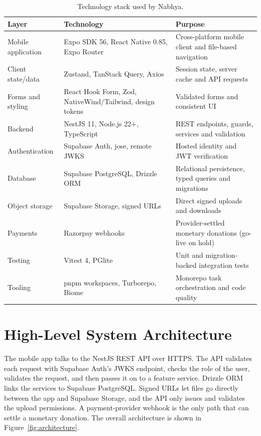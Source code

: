\begin{table}[H]\centering
\caption{Technology stack used by Nabhya.}
\label{tab:stack}
\begin{tabularx}{\textwidth}{|p{}|p{}|X|}
\hline
\textbf{Layer} & \textbf{Technology} & \textbf{Purpose}\\\hline
Mobile application & Expo SDK 56, React Native 0.85, Expo Router & Cross-platform mobile client and file-based navigation\\\hline
Client state/data & Zustand, TanStack Query, Axios & Session state, server cache and API requests\\\hline
Forms and styling & React Hook Form, Zod, NativeWind/Tailwind, design tokens & Validated forms and consistent UI\\\hline
Backend & NestJS 11, Node.js 22+, TypeScript & REST endpoints, guards, services and validation\\\hline
Authentication & Supabase Auth, jose, remote JWKS & Hosted identity and JWT verification\\\hline
Database & Supabase PostgreSQL, Drizzle ORM & Relational persistence, typed queries and migrations\\\hline
Object storage & Supabase Storage, signed URLs & Direct signed uploads and downloads\\\hline
Payments & Razorpay webhooks & Provider-settled monetary donations (go-live on hold)\\\hline
Testing & Vitest 4, PGlite & Unit and migration-backed integration tests\\\hline
Tooling & pnpm workspaces, Turborepo, Biome & Monorepo task orchestration and code quality\\\hline
\end{tabularx}
\end{table}

\section{High-Level System Architecture}
The mobile app talks to the NestJS REST API over HTTPS. The API validates each request with Supabase Auth's JWKS endpoint, checks the role of the user, validates the request, and then passes it on to a feature service. Drizzle ORM links the services to Supabase PostgreSQL. Signed URLs let files go directly between the app and Supabase Storage, and the API only issues and validates the upload permissions. A payment-provider webhook is the only path that can settle a monetary donation. The overall architecture is shown in Figure~\ref{fig:architecture}.


